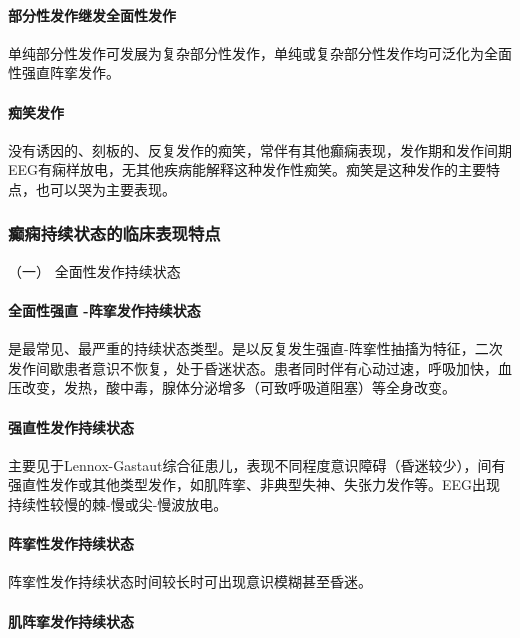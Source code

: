 \paragraph{部分性发作继发全面性发作}

单纯部分性发作可发展为复杂部分性发作，单纯或复杂部分性发作均可泛化为全面性强直阵挛发作。

\paragraph{痴笑发作}

没有诱因的、刻板的、反复发作的痴笑，常伴有其他癫痫表现，发作期和发作间期EEG有痫样放电，无其他疾病能解释这种发作性痴笑。痴笑是这种发作的主要特点，也可以哭为主要表现。

\subsubsection{癫痫持续状态的临床表现特点}

\hypertarget{text00245.htmlux5cux23CHP8-2-2-3-1}{}
（一） 全面性发作持续状态

\paragraph{全面性强直 -阵挛发作持续状态}

是最常见、最严重的持续状态类型。是以反复发生强直-阵挛性抽搐为特征，二次发作间歇患者意识不恢复，处于昏迷状态。患者同时伴有心动过速，呼吸加快，血压改变，发热，酸中毒，腺体分泌增多（可致呼吸道阻塞）等全身改变。

\paragraph{强直性发作持续状态}

主要见于Lennox-Gastaut综合征患儿，表现不同程度意识障碍（昏迷较少），间有强直性发作或其他类型发作，如肌阵挛、非典型失神、失张力发作等。EEG出现持续性较慢的棘-慢或尖-慢波放电。

\paragraph{阵挛性发作持续状态}

阵挛性发作持续状态时间较长时可出现意识模糊甚至昏迷。

\paragraph{肌阵挛发作持续状态}

